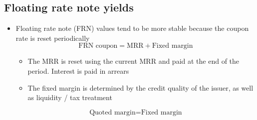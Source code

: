 \documentclass[../notes_compiled.tex]{subfiles}
\begin{document}
\subsection{Floating rate note yields}
\begin{itemize}
\item Floating rate note (FRN) values tend to be more stable because the coupon rate is reset periodically
\begin{equation}
\text{FRN coupon} = \text{MRR} + \text{Fixed margin}
\end{equation}
\begin{itemize}
\item The MRR is reset using the current MRR and paid at the end of the period. Interest is paid in arrears
\item The fixed margin is determined by the credit quality of the issuer, as well as liquidity / tax treatment
\end{itemize}
\begin{equation}
\text{Quoted margin} = \text{Fixed margin}
\end{equation}
\end{itemize}
\end{document}
